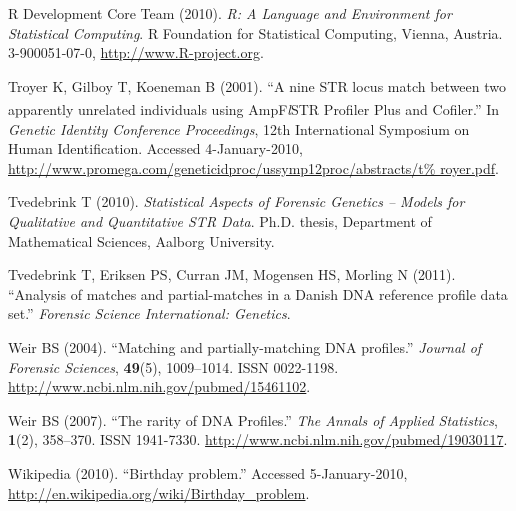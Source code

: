 \documentclass[a4paper,11pt]{article}
\begin{document}
\begin{thebibliography}{}
{R Development Core Team} (2010).
\newblock \emph{R: A Language and Environment for Statistical Computing}.
\newblock R Foundation for Statistical Computing, Vienna, Austria.
 3-900051-07-0, \urlprefix\url{http://www.R-project.org}.

Troyer K, Gilboy T, Koeneman B (2001).
\newblock \enquote{A nine {STR} locus match between two apparently unrelated
  individuals using {A}mp{F}\textit{l}{STR}\textsuperscript{\textregistered}
  {P}rofiler {P}lus\textsuperscript{\texttrademark} and
  {C}ofiler\textsuperscript{\texttrademark}.}
\newblock In \emph{Genetic Identity Conference Proceedings}, 12th International
  Symposium on Human Identification.
\newblock Accessed 4-January-2010,
  \urlprefix\url{http://www.promega.com/geneticidproc/ussymp12proc/abstracts/t%
royer.pdf}.

Tvedebrink T (2010).
\newblock \emph{Statistical Aspects of Forensic Genetics -- Models for
  Qualitative and Quantitative STR Data}.
\newblock Ph.D. thesis, Department of Mathematical Sciences, Aalborg
  University.

Tvedebrink T, Eriksen PS, Curran JM, Mogensen HS, Morling N (2011).
\newblock \enquote{Analysis of matches and partial-matches in a Danish DNA
  reference profile data set.}
\newblock \emph{Forensic Science International: Genetics}.

Weir BS (2004).
\newblock \enquote{Matching and partially-matching {DNA} profiles.}
\newblock \emph{Journal of Forensic Sciences}, \textbf{49}(5), 1009--1014.
\newblock ISSN 0022-1198.
\newblock \urlprefix\url{http://www.ncbi.nlm.nih.gov/pubmed/15461102}.

Weir BS (2007).
\newblock \enquote{The rarity of {DNA} Profiles.}
\newblock \emph{The Annals of Applied Statistics}, \textbf{1}(2), 358--370.
\newblock ISSN 1941-7330.
\newblock \urlprefix\url{http://www.ncbi.nlm.nih.gov/pubmed/19030117}.

Wikipedia (2010).
\newblock \enquote{Birthday problem.}
\newblock Accessed 5-January-2010,
  \urlprefix\url{http://en.wikipedia.org/wiki/Birthday_problem}.
\end{thebibliography}
\end{document}
